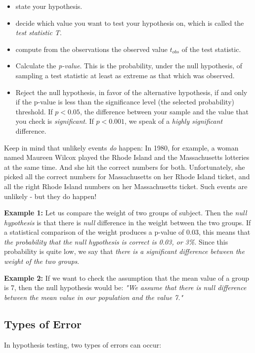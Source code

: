 \begin{itemize}
  \item   state your hypothesis.
  \item   decide which value you want to test your hypothesis on, which is called the \emph{test statistic T}.
  \item   compute from the observations the observed value $t_{obs}$ of the test statistic.
  \item   Calculate the \emph{p-value}. This is the probability, under the null hypothesis, of sampling a test statistic at least as extreme as that which was observed.
  \item   Reject the null hypothesis, in favor of the alternative hypothesis, if and only if the p-value is less than the significance level (the selected probability) threshold. If $p<0.05$, the difference between your sample and the value that you check is \emph{significant}. If $p<0.001$, we speak of a \emph{highly significant} difference.
\end{itemize}

Keep in mind that unlikely events \emph{do} happen: In 1980, for example, a woman named Maureen Wilcox played the Rhode Island and the Massachusetts lotteries at the same time. And she hit the correct numbers for both. Unfortunately, she picked all the correct numbers for Massachusetts on her Rhode Island ticket, and all the right Rhode Island numbers on her Massachusetts ticket. Such events are unlikely - but they do happen!


\textbf{Example 1: } Let us compare the weight of two groups of subject. Then the \emph{null hypothesis} is that there is \emph{null} difference in the weight between the two groups. If a statistical comparison of the weight produces a p-value of 0.03, this means that \emph{the probability that the null hypothesis is correct is 0.03, or 3\%}. Since this probability is quite low, we say that \emph{there is a significant difference between the weight of the two groups}.

\textbf{Example 2: } If we want to check the assumption that the mean value of a group is 7, then the null hypothesis would be: \emph{"We assume that there is null difference between the mean value in our population and the value 7."}

\subsection{Types of Error}
In hypothesis testing, two types of errors can occur:

